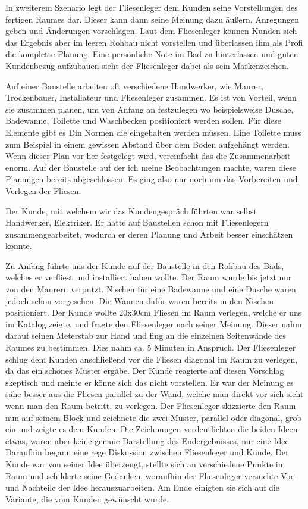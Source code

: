 In zweiterem Szenario legt der Fliesenleger dem Kunden seine Vorstellungen des fertigen Raumes dar. Dieser kann dann seine Meinung dazu äußern, Anregungen geben und Änderungen vorschlagen. Laut dem Fliesenleger können Kunden sich das Ergebnis aber im leeren Rohbau nicht vorstellen und überlassen ihm als Profi die komplette Planung. Eine persönliche Note im Bad zu hinterlassen und guten Kundenbezug aufzubauen sieht der Fliesenleger dabei als sein Markenzeichen.

Auf einer Baustelle arbeiten oft verschiedene Handwerker, wie Maurer, Trockenbauer, Installateur und Fliesenleger zusammen. Es ist von Vorteil, wenn sie zusammen planen, um von Anfang an festzulegen wo beispielsweise Dusche, Badewanne, Toilette und Waschbecken positioniert werden sollen. Für diese Elemente gibt es Din Normen die eingehalten werden müssen. Eine Toilette muss zum Beispiel in einem gewissen Abstand über dem Boden aufgehängt werden. Wenn dieser Plan vor-her festgelegt wird, vereinfacht das die Zusammenarbeit enorm. Auf der Baustelle auf der ich meine Beobachtungen machte, waren diese Planungen bereits abgeschlossen. Es ging also nur noch um das Vorbereiten und Verlegen der Fliesen.

Der Kunde, mit welchem wir das Kundengespräch führten war selbst Handwerker, Elektriker. Er hatte auf Baustellen schon mit Fliesenlegern zusammengearbeitet, wodurch er deren Planung und Arbeit besser einschätzen konnte. 

Zu Anfang führte uns der Kunde auf der Baustelle in den Rohbau des Bads, welches er verfliest und installiert haben wollte. Der Raum wurde bis jetzt nur von den Maurern verputzt. Nischen für eine Badewanne und eine Dusche waren jedoch schon vorgesehen. Die Wannen dafür waren bereits in den Nischen positioniert. Der Kunde wollte 20x30cm Fliesen im Raum verlegen, welche er uns im Katalog zeigte, und fragte den Fliesenleger nach seiner Meinung. Dieser nahm darauf seinen Meterstab zur Hand und fing an die einzelnen Seitenwände des Raumes zu bestimmen. Dies nahm ca. 5 Minuten in Anspruch. Der Fliesenleger schlug dem Kunden anschließend vor die Fliesen diagonal im Raum zu verlegen, da das ein schönes Muster ergäbe. Der Kunde reagierte auf diesen Vorschlag skeptisch und meinte er könne sich das nicht vorstellen. Er war der Meinung es sähe besser aus die Fliesen parallel zu der Wand, welche man direkt vor sich sieht wenn man den Raum betritt, zu verlegen. Der Fliesenleger skizzierte den Raum nun auf seinem Block und zeichnete die zwei Muster, parallel oder diagonal, grob ein und zeigte es dem Kunden. Die Zeichnungen verdeutlichten die beiden Ideen etwas, waren aber keine genaue Darstellung des Endergebnisses, nur eine Idee. Daraufhin begann eine rege Diskussion zwischen Fliesenleger und Kunde. Der Kunde war von seiner Idee überzeugt, stellte sich an verschiedene Punkte im Raum und schilderte seine Gedanken, woraufhin der Fliesenleger versuchte Vor- und Nachteile der Idee herauszuarbeiten. Am Ende einigten sie sich auf die Variante, die vom Kunden gewünscht wurde.

